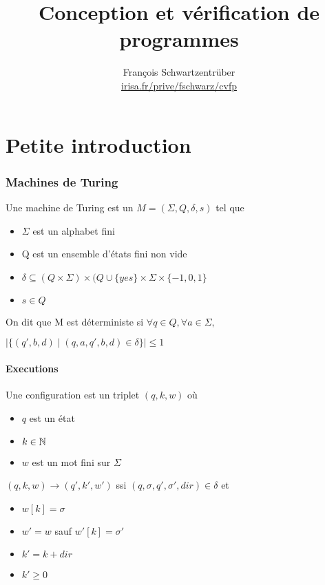 \documentclass[10pt,a4paper]{article}
\title{Conception et vérification de programmes}
\author{François Schwartzentrüber\\
\url{irisa.fr/prive/fschwarz/cvfp}}
\date{}
\begin{document}
\renewcommand{\labelitemi}{$\bullet$}

\maketitle

\part{Petite introduction}

\section{Machines de Turing}

\begin{definition} Une machine de Turing est un $M = ( \Sigma , Q , \delta, s)$ tel que \begin{itemize}
\item $\Sigma$ est un alphabet fini
\item Q est un ensemble d'états fini non vide
\item $\delta \subseteq (Q \times \Sigma) \times (Q \cup \{yes \} \times \Sigma \times \{-1, 0, 1\}$
\item $s \in Q$
\end{itemize}
On dit que M est déterministe si $\forall q \in Q, \forall a \in \Sigma,$

$\mid \{ (q', b, d) \mid (q, a, q', b, d) \in \delta \} \mid \leq 1$
\end{definition}

\subsection{Executions}
\begin{definition}[Configuration]
Une configuration est un triplet $(q, k, w)$ où \begin{itemize}
\item $q$ est un état
\item $k \in \mathbb{N}$
\item $w$ est un mot fini sur $\Sigma$
\end{itemize}
\end{definition}

\begin{definition}[Transition]
$(q, k, w) \rightarrow (q', k', w')$ ssi $(q, \sigma, q', \sigma', dir) \in \delta$ et \begin{itemize}
\item $w[k] = \sigma$
\item $w' = w$ sauf $w'[k] = \sigma'$
\item $k' = k + dir$
\item $k' \geq 0$
\end{itemize}\end{definition}
\end{document}
